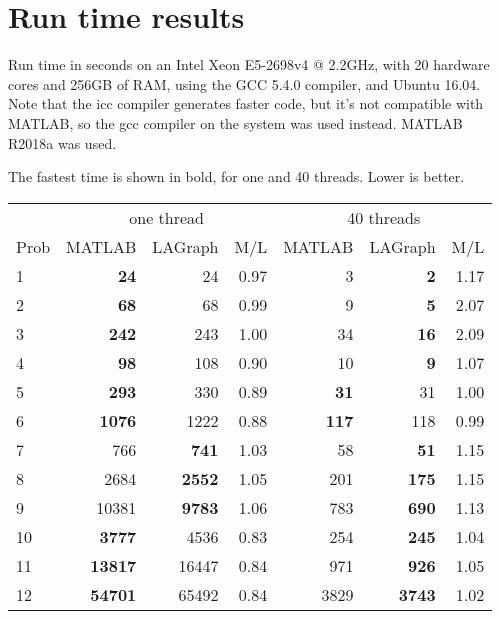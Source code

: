 \documentclass[12pt]{article}
\begin{document}
\section{Run time results}

Run time in seconds on an Intel Xeon E5-2698v4 @ 2.2GHz, with 20 hardware cores
and 256GB of RAM, using the GCC 5.4.0 compiler, and Ubuntu 16.04.  Note that
the icc compiler generates faster code, but it's not compatible with MATLAB,
so the gcc compiler on the system was used instead.
MATLAB R2018a was used.

The fastest time is shown in bold, for one and 40 threads.
Lower is better.

\vspace{0.1in}
\begin{tabular}{l|rr|r||rr|r}
\hline
     & \multicolumn{3}{c}{one thread}               &  \multicolumn{3}{c}{40 threads}  \\
Prob & MATLAB & LAGraph & M/L                       &   MATLAB & LAGraph & M/L         \\
\hline
  1 & {\bf       24 }&            24  &     0.97    &            3  & {\bf        2 }&     1.17   \\
  2 & {\bf       68 }&            68  &     0.99    &            9  & {\bf        5 }&     2.07   \\
  3 & {\bf      242 }&           243  &     1.00    &           34  & {\bf       16 }&     2.09   \\
\hline
  4 & {\bf       98 }&           108  &     0.90    &           10  & {\bf        9 }&     1.07   \\
  5 & {\bf      293 }&           330  &     0.89    &{\bf       31 }&            31  &     1.00   \\
  6 & {\bf     1076 }&          1222  &     0.88    &{\bf      117 }&           118  &     0.99   \\
\hline
  7 &          766  & {\bf      741 }&     1.03     &          58  & {\bf       51 }&     1.15   \\
  8 &         2684  & {\bf     2552 }&     1.05     &         201  & {\bf      175 }&     1.15   \\
  9 &        10381  & {\bf     9783 }&     1.06     &         783  & {\bf      690 }&     1.13   \\
\hline
 10 &{\bf     3777 }&          4536  &     0.83     &         254  & {\bf      245 }&     1.04   \\
 11 &{\bf    13817 }&         16447  &     0.84     &         971  & {\bf      926 }&     1.05   \\
 12 &{\bf    54701 }&         65492  &     0.84     &        3829  & {\bf     3743 }&     1.02   \\
\end{tabular}
\end{document}
